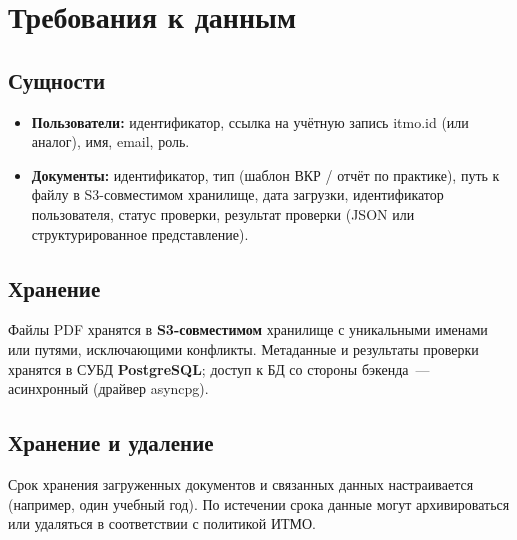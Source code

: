 \section{Требования к данным}

\subsection{Сущности}

\begin{itemize}
  \item \textbf{Пользователи:} идентификатор, ссылка на учётную запись itmo.id (или аналог), имя, email, роль.
  \item \textbf{Документы:} идентификатор, тип (шаблон ВКР / отчёт по практике), путь к файлу в S3-совместимом хранилище, дата загрузки, идентификатор пользователя, статус проверки, результат проверки (JSON или структурированное представление).
\end{itemize}

\subsection{Хранение}

Файлы PDF хранятся в \textbf{S3-совместимом} хранилище с уникальными именами или путями, исключающими конфликты. Метаданные и результаты проверки хранятся в СУБД \textbf{PostgreSQL}; доступ к БД со стороны бэкенда~--- асинхронный (драйвер asyncpg).

\subsection{Хранение и удаление}

Срок хранения загруженных документов и связанных данных настраивается (например, один учебный год). По истечении срока данные могут архивироваться или удаляться в соответствии с политикой ИТМО.
